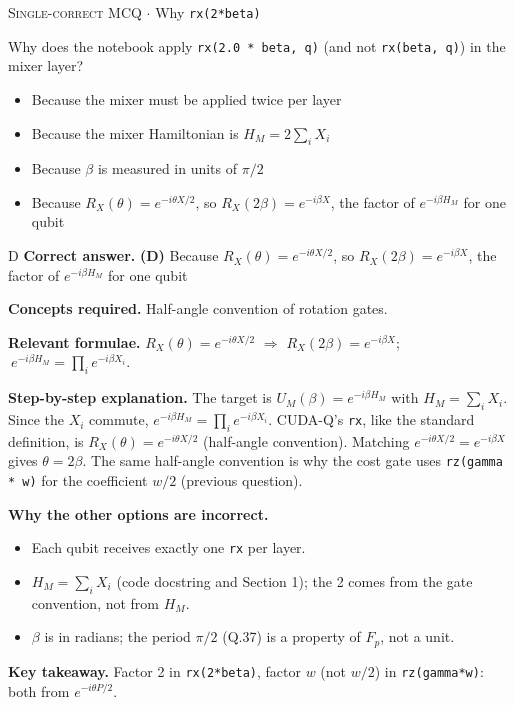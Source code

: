 \documentclass[11pt,a4paper]{article}
\newcommand{\optlabel}[1]{\textbf{(#1)}}
\newcommand{\correctlabel}[1]{\textcolor{okgreen}{\textbf{(#1)}\,\ding{51}}}
\newenvironment{qitem}[1]{\begin{list}{}{\setlength{\leftmargin}{3.3em}\setlength{\labelwidth}{3.1em}%
  \setlength{\labelsep}{0.2em}\setlength{\topsep}{3pt}\setlength{\parsep}{3pt}}\item[\textbf{Q.#1}\hfill]}{\end{list}}
\newcommand{\qsep}{\par\vspace{2pt}{\color{black!15}\hrule}\vspace{4pt}}
\newcommand{\qmeta}[2]{{\footnotesize\color{black!60}\textsc{#1} \;$\cdot$\; #2}\par}
\begin{document}
\begin{qitem}{44}
\qmeta{Single-correct MCQ}{Why \texttt{rx(2*beta)}}
Why does the notebook apply \texttt{rx(2.0 * beta, q)} (and not \texttt{rx(beta, q)}) in the mixer layer?
\begin{itemize}[leftmargin=2.6em, labelsep=0.4em, itemsep=2pt, topsep=3pt]
\item[\optlabel{A}] Because the mixer must be applied twice per layer
\item[\optlabel{B}] Because the mixer Hamiltonian is $H_M = 2\sum_i X_i$
\item[\optlabel{C}] Because $\beta$ is measured in units of $\pi/2$
\item[\correctlabel{D}] Because $R_X(\theta) = e^{-i\theta X/2}$, so $R_X(2\beta) = e^{-i\beta X}$, the factor of $e^{-i\beta H_M}$ for one qubit
\end{itemize}
\end{qitem}
\begin{solbox}{D}
\textbf{\color{brand}Correct answer.} \textcolor{okgreen}{\textbf{(D)}} Because $R_X(\theta) = e^{-i\theta X/2}$, so $R_X(2\beta) = e^{-i\beta X}$, the factor of $e^{-i\beta H_M}$ for one qubit

\textbf{\color{brand}Concepts required.} Half-angle convention of rotation gates.

\textbf{\color{brand}Relevant formulae.} $R_X(\theta) = e^{-i\theta X/2}$ $\Rightarrow$ $R_X(2\beta) = e^{-i\beta X}$; $\ e^{-i\beta H_M} = \prod_i e^{-i\beta X_i}$.

\textbf{\color{brand}Step-by-step explanation.} The target is $U_M(\beta) = e^{-i\beta H_M}$ with $H_M = \sum_i X_i$. Since the $X_i$ commute,
$e^{-i\beta H_M} = \prod_i e^{-i\beta X_i}$. CUDA-Q's \texttt{rx}, like the standard definition, is $R_X(\theta) = e^{-i\theta X/2}$ (half-angle
convention). Matching $e^{-i\theta X/2} = e^{-i\beta X}$ gives $\theta = 2\beta$. The same half-angle convention is why the cost gate
uses \texttt{rz(gamma * w)} for the coefficient $w/2$ (previous question).

\textbf{\color{brand}Why the other options are incorrect.}
\begin{itemize}[leftmargin=2.4em, itemsep=1pt, topsep=2pt]
\item[\textbf{(A)}] Each qubit receives exactly one \texttt{rx} per layer.
\item[\textbf{(B)}] $H_M = \sum_iX_i$ (code docstring and Section 1); the 2 comes from the gate convention, not from $H_M$.
\item[\textbf{(C)}] $\beta$ is in radians; the period $\pi/2$ (Q.37) is a property of $F_p$, not a unit.
\end{itemize}
\textbf{\color{brand}Key takeaway.} Factor 2 in \texttt{rx(2*beta)}, factor $w$ (not $w/2$) in \texttt{rz(gamma*w)}: both from $e^{-i\theta P/2}$.
\end{solbox}
\qsep
\end{document}
